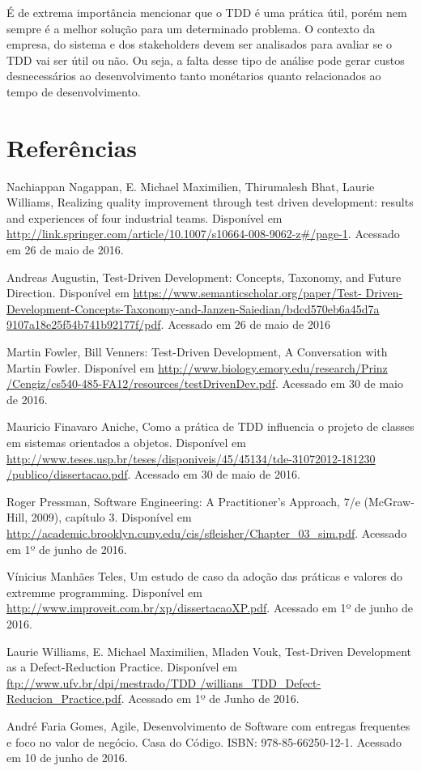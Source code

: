 \documentclass[12pt]{article}
\begin{document}
  É de extrema importância mencionar que o TDD é uma prática útil, porém nem 
  sempre é a melhor solução para um determinado problema. O contexto da empresa, 
  do sistema e dos stakeholders devem ser analisados para avaliar se o TDD vai 
  ser útil ou não. Ou seja, a falta desse tipo de análise pode gerar custos 
  desnecessários ao desenvolvimento tanto monétarios quanto relacionados ao 
  tempo de desenvolvimento.
  \clearpage

  \section{Referências}

  \begin{flushleft}
  Nachiappan Nagappan, E. Michael Maximilien, Thirumalesh Bhat,
  Laurie Williams, Realizing quality improvement through test driven 
  development: results and experiences of four industrial teams. Disponível em
  \url{http://link.springer.com/article/10.1007/s10664-008-9062-z#/page-1}.
  Acessado em 26 de maio de 2016.

  Andreas Augustin, Test-Driven Development: Concepts, Taxonomy, and Future 
  Direction. Disponível em \url{https://www.semanticscholar.org/paper/Test-
  Driven-Development-Concepts-Taxonomy-and-Janzen-Saiedian/bdcd570eb6a45d7a
  9107a18e25f54b741b92177f/pdf}. Acessado em 26 de maio de 2016

  Martin Fowler, Bill Venners: Test-Driven Development, A Conversation with 
  Martin Fowler. Disponível em \url{http://www.biology.emory.edu/research/Prinz
  /Cengiz/cs540-485-FA12/resources/testDrivenDev.pdf}. Acessado em 30 de maio de
  2016.

  Mauricio Finavaro Aniche, Como a prática de TDD influencia o projeto de 
  classes em sistemas orientados a objetos. Disponível em 
  \url{http://www.teses.usp.br/teses/disponiveis/45/45134/tde-31072012-181230
  /publico/dissertacao.pdf}. Acessado em 30 de maio de 2016.

  Roger Pressman, Software Engineering: A Practitioner’s Approach, 7/e 
  (McGraw-Hill, 2009), capítulo 3.  Disponível em
  \url{http://academic.brooklyn.cuny.edu/cis/sfleisher/Chapter_03_sim.pdf}.
  Acessado em 1º de junho de 2016.

  Vínicius Manhães Teles, Um estudo de caso da adoção das práticas e valores do
  extremme programming. Disponível em
  \url{http://www.improveit.com.br/xp/dissertacaoXP.pdf}. Acessado em 1º de 
  junho de 2016.

  Laurie Williams, E. Michael Maximilien, Mladen Vouk, Test-Driven Development 
  as a Defect-Reduction Practice. Disponível em 
  \url{ftp://www.ufv.br/dpi/mestrado/TDD
  /willians_TDD_Defect-Reducion_Practice.pdf}. Acessado em 1º de Junho de 2016.

  André Faria Gomes, Agile, Desenvolvimento de Software com entregas frequentes
  e foco no valor de negócio. Casa do Código. ISBN: 978-85-66250-12-1. Acessado
  em 10 de junho de 2016.
  
  \end{flushleft}
\end{document}
